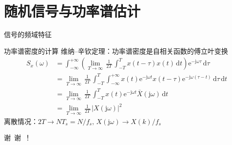 \documentclass[UTF8]{ctexbeamer}
\begin{document}
\section{随机信号与功率谱估计}


\begin{frame}{信号的频域特征}
\end{frame}



\begin{frame}{功率谱密度的计算}
    维纳--辛钦定理：功率谱密度是自相关函数的傅立叶变换
    \begin{align*}
        S_x(\omega) &= \int_{-\infty}^{+\infty} \left( \lim_{T \to \infty} \, \frac{1}{2T} \, \int_{-T}^{T} x(t-\tau)x(t) \,\mathrm{d} t   \right) \mathrm{e}^{-\mathrm{j}\omega\tau} \,\mathrm{d} \tau  \\
        &= \lim_{T \to \infty} \, \frac{1}{2T} \, \int_{-T}^{T} \int_{-\infty}^{+\infty} x(t)\mathrm{e}^{-\mathrm{j} \omega t} x(t-\tau)\mathrm{e}^{-\mathrm{j}\omega(\tau-t)} \,\mathrm{d} \tau \,\mathrm{d} t \\
        &= \lim_{T \to \infty} \, \frac{1}{2T} \, \int_{-T}^{T}  x(t)\mathrm{e}^{-\mathrm{j} \omega t} \bar{X}(\mathrm{j}\omega) \,\mathrm{d} t \\
        &= \lim_{T \to \infty} \, \frac{1}{2T} \, \left| X(\mathrm{j}\omega) \right|^2
    \end{align*}
    离散情况：$2T \rightarrow NT_s = N/f_s,\, X(\mathrm{j}\omega)\rightarrow X(k)/f_s$
\end{frame}




\begin{frame}[standout]
     谢\ 谢\ ！
\end{frame}
\end{document}

